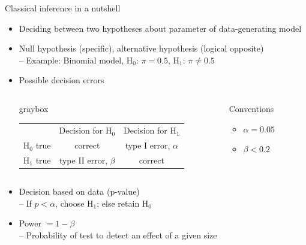 \documentclass[aspectratio=169]{beamer}
\newenvironment{colbox}[1][\textwidth]%
  {\begin{beamercolorbox}[wd=#1, rounded=true, shadow=true]{graybox}}
  {\end{beamercolorbox}}
\begin{document}
\begin{frame}{Classical inference in a nutshell}

\begin{itemize}
\item Deciding between two hypotheses about parameter of data-generating
model \citep{NeymanPearson33}

\item Null hypothesis (specific), alternative hypothesis (logical opposite)\\
-- Example: Binomial model, H$_0$: $\pi = 0.5$, H$_1$: $\pi \neq 0.5$

\item Possible decision errors\\[1ex]

\renewcommand{\arraystretch}{1.2}
\begin{columns}
\begin{column}{7cm}
\begin{colbox}[7.6cm]
\centering
\begin{tabular}{l|c|c|}
\multicolumn{1}{l}{} & \multicolumn{1}{c}{Decision for H$_0$}
 & \multicolumn{1}{c}{Decision for H$_1$}\\ \cline{2-3}
H$_0$ true & correct                & type I error, $\alpha$\\ \cline{2-3}
H$_1$ true & type II error, $\beta$ & correct               \\ \cline{2-3}
\end{tabular}
\end{colbox}
\end{column}
%
\begin{column}{3cm}
Conventions
\begin{itemize}
\item $\alpha = 0.05$
\item $\beta < 0.2$
\end{itemize}
\end{column}
\end{columns}

\vspace{1ex}

\item Decision based on data (p-value)\\
-- If $p < \alpha$, choose H$_1$; else retain H$_0$

\item Power $= 1 - \beta$\\
-- Probability of test to detect an effect of a given size
\end{itemize}

\end{frame}
\end{document}
